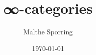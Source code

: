 \documentclass[12pt,a4paper]{article}
\title{∞-categories}
\author{Malthe Sporring}
\date{\today}
\numberwithin{thm}{section}
\theoremstyle{plain}
\theoremstyle{definition}
\begin{document}
{
\maketitle
}


%
\end{document}
